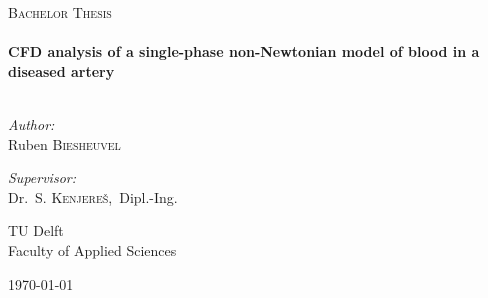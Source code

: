 \begin{titlepage}
\begin{center}



\textsc{\Large Bachelor Thesis}\\[0.5cm]

\HRule \\[0.4cm]
{ \huge \bfseries CFD analysis of a single-phase non-Newtonian model of blood in a diseased artery}\\[0.4cm]

\HRule \\[1.5cm]

\begin{minipage}{0.45\textwidth}
\begin{flushleft} \large
\emph{Author:}\\
Ruben \textsc{Biesheuvel}\\
\end{flushleft}
\end{minipage}
\begin{minipage}{0.50\textwidth}
\begin{flushright} \large
\emph{Supervisor:} \\
Dr.~S. \textsc{Kenjere\v{s}},~Dipl.-Ing.

\end{flushright}
\end{minipage}

\vfill

\begin{minipage}{0.45\textwidth}
\begin{flushleft}
{\large TU Delft}\\
{\normalsize Faculty of Applied Sciences}
\end{flushleft}
\end{minipage}
\begin{minipage}{0.45\textwidth}
\begin{flushright}
{\large \today}
\end{flushright}
\end{minipage}




\end{center}
\end{titlepage}
